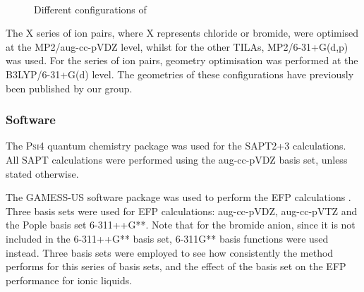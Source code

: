 \begin{figure}
    \centering
    \mbox{
    }
    \mbox{
    }                                 
    \mbox{                            
    }
    \caption{Different configurations of \protect{} \label{fig:conf-c2mpyr-ntf2}}
\end{figure}


The X series of ion pairs, where X represents chloride or bromide, were optimised at the MP2/aug-cc-pVDZ level, whilst for the other TILAs, MP2/6-31+G(d,p) was used.
For the  series of ion pairs, geometry optimisation was performed at the B3LYP/6-31+G(d) level.
The geometries of these configurations have previously been published by our group.
\cite{Izgorodina2014a, Rigby2014a}


\subsubsection{Software}

The \textsc{Psi4} quantum chemistry package was used for the SAPT2+3 calculations. 
\cite{Turney2012a}
All SAPT calculations were performed using the aug-cc-pVDZ basis set, unless stated otherwise.
\cite{Izgorodina2014a}

The GAMESS-US software package was used to perform the EFP calculations
\cite{Schmidt1993a, Gordon2005a}.
Three basis sets were used for EFP calculations: aug-cc-pVDZ, aug-cc-pVTZ and the Pople basis set 6-311++G**. Note that for the bromide anion, since it is not included in the 6-311++G** basis set, 6-311G** basis functions were used instead.
Three basis sets were employed to see how consistently the method performs for this series of basis sets, and the effect of the basis set on the EFP performance for ionic liquids.

